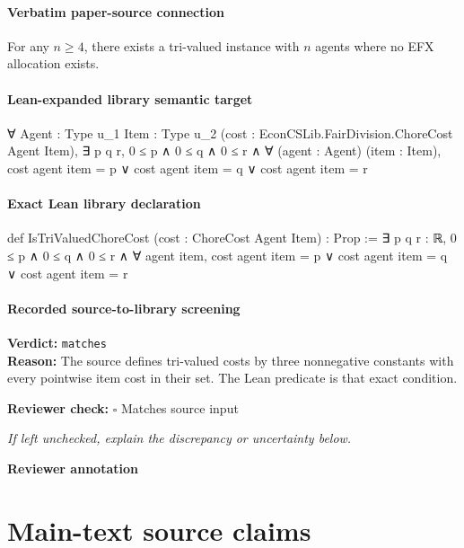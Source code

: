 \documentclass[10pt]{article}
\newcommand{\reviewerbox}{%
  \par\noindent\fbox{\parbox{0.96\linewidth}{\rule{0pt}{0.38in}}}\par
}
\newcommand{\reviewmatch}[1]{%
  \par\noindent\textbf{Reviewer check:} $\square$\; #1\par
  \noindent\emph{If left unchecked, explain the discrepancy or uncertainty below.}\par
}
\begin{document}
\paragraph{Verbatim paper-source connection}
\begin{ReviewVerbatim}
\begin{theorem}\label{thm:tri}
    For any $n\geq 4$, there exists a tri-valued instance with $n$ agents where no EFX allocation exists.
\end{theorem}
\end{ReviewVerbatim}

\paragraph{Lean-expanded library semantic target}
\begin{ReviewVerbatim}
∀ {Agent : Type u_1} {Item : Type u_2} (cost : EconCSLib.FairDivision.ChoreCost Agent Item),
  ∃ p q r,
    0 ≤ p ∧
      0 ≤ q ∧ 0 ≤ r ∧ ∀ (agent : Agent) (item : Item), cost agent item = p ∨ cost agent item = q ∨ cost agent item = r
\end{ReviewVerbatim}

\paragraph{Exact Lean library declaration}
\begin{ReviewVerbatim}
def IsTriValuedChoreCost (cost : ChoreCost Agent Item) : Prop :=
  ∃ p q r : ℝ, 0 ≤ p ∧ 0 ≤ q ∧ 0 ≤ r ∧
    ∀ agent item, cost agent item = p ∨ cost agent item = q ∨ cost agent item = r
\end{ReviewVerbatim}

\paragraph{Recorded source-to-library screening}
\textbf{Verdict:} \texttt{matches}
\\
\textbf{Reason:} The source defines tri-valued costs by three nonnegative constants with every pointwise item cost in their set. The Lean predicate is that exact condition.
\reviewmatch{Matches source input}
\noindent\textbf{Reviewer annotation}\par
\reviewerbox

\clearpage
\hypertarget{source-claim-86903902a11cb58c}{}
\hypertarget{source-section-0c7af8265958a9ea}{}
\section*{Main-text source claims}
\end{document}
